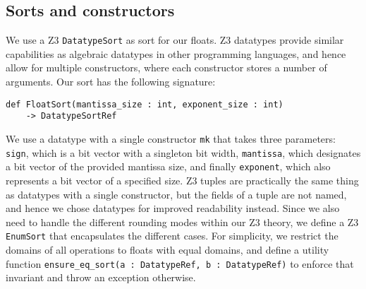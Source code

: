 \documentclass[a4paper,UKenglish,cleveref, autoref, thm-restate]{lipics-v2019}
\begin{document}
\subsection{Sorts and constructors}
We use a Z3 \verb|DatatypeSort| as sort for our floats. Z3 datatypes provide similar capabilities as algebraic datatypes in other programming languages, and hence allow for multiple constructors, where each constructor stores a number of arguments. Our sort has the following signature:
\begin{lstlisting}
def FloatSort(mantissa_size : int, exponent_size : int) 
    -> DatatypeSortRef
\end{lstlisting}
We use a datatype with a single constructor \verb|mk| that takes three parameters: \verb|sign|, which is a bit vector with a singleton bit width, \verb|mantissa|, which designates a bit vector of the provided mantissa size, and finally \verb|exponent|, which also represents a bit vector of a specified size. Z3 tuples are practically the same thing as datatypes with a single constructor, but the fields of a tuple are not named, and hence we chose datatypes for improved readability instead.
Since we also need to handle the different rounding modes within our Z3 theory, we define a Z3 \verb|EnumSort| that encapsulates the different cases.
For simplicity, we restrict the domains of all operations to floats with equal domains, and define a utility function \verb|ensure_eq_sort(a : DatatypeRef, b : DatatypeRef)| to enforce that invariant and throw an exception otherwise.
\end{document}
